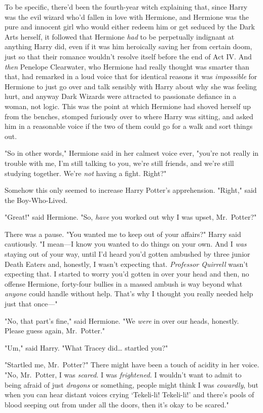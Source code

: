 To be specific, there'd been the fourth-year witch explaining that, since Harry
was the evil wizard who'd fallen in love with Hermione, and Hermione was the
pure and innocent girl who would either redeem him or get seduced by the Dark
Arts herself, it followed that Hermione \emph{had} to be perpetually indignant
at anything Harry did, even if it was him heroically saving her from certain
doom, just so that their romance wouldn't resolve itself before the end of Act
IV. And \emph{then} Penelope Clearwater, who Hermione had really thought was
smarter than that, had remarked in a loud voice that for identical reasons it
was \emph{impossible} for Hermione to just go over and talk sensibly with Harry
about why she was feeling hurt, and anyway Dark Wizards were attracted to
passionate defiance in a woman, not logic. This was the point at which Hermione
had shoved herself up from the benches, stomped furiously over to where Harry
was sitting, and asked him in a reasonable voice if the two of them could go
for a walk and sort things out.

"So in other words," Hermione said in her calmest voice ever, "you're not
really in trouble with me, I'm still talking to you, we're still friends, and
we're still studying together. We're \emph{not} having a fight. Right?"

Somehow this only seemed to increase Harry Potter's apprehension. "Right," said
the Boy-Who-Lived.

"Great!" said Hermione. "So, \emph{have} you worked out why I was upset,
Mr.~Potter?"

There was a pause. "You wanted me to keep out of your affairs?" Harry said
cautiously. "I mean---I know you wanted to do things on your own. And I
\emph{was} staying out of your way, until I'd heard you'd gotten ambushed by
three junior Death Eaters and, honestly, I wasn't expecting that.
\emph{Professor Quirrell} wasn't expecting that. I started to worry you'd
gotten in over your head and then, no offense Hermione, forty-four bullies in a
massed ambush is way beyond what \emph{anyone} could handle without help.
That's why I thought you really needed help just that once---"

"No, that part's fine," said Hermione. "We \emph{were} in over our heads,
honestly. Please guess again, Mr.~Potter."

"Um," said Harry. "What Tracey did{\ldots} startled you?"

"Startled me, Mr.~Potter?" There might have been a touch of acidity in her
voice. "No, Mr.~Potter, I was \emph{scared.} I was \emph{frightened.} I
wouldn't want to admit to being afraid of just \emph{dragons} or something,
people might think I was \emph{cowardly}, but when you can hear distant voices
crying `Tekeli-li! Tekeli-li!' and there's pools of blood seeping out from
under all the doors, then it's okay to be scared."

